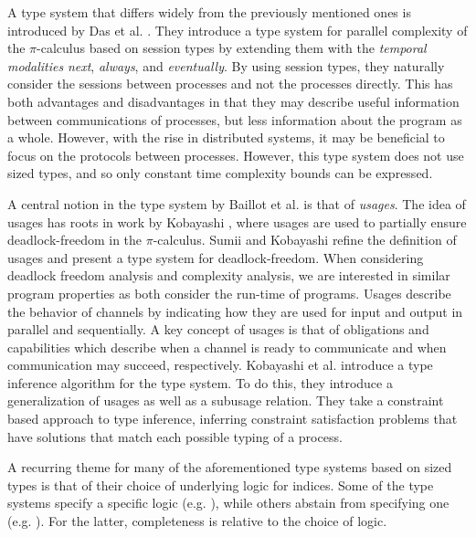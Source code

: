 A type system that differs widely from the previously mentioned ones is introduced by Das et al. \cite{DasEtAl2018}. They introduce a type system for parallel complexity of the $\pi$-calculus based on session types by extending them with the \textit{temporal modalities} \textit{next}, \textit{always}, and \textit{eventually}. By using session types, they naturally consider the sessions between processes and not the processes directly. This has both advantages and disadvantages in that they may describe useful information between communications of processes, but less information about the program as a whole. However, with the rise in distributed systems, it may be beneficial to focus on the protocols between processes. However, this type system does not use sized types, and so only constant time complexity bounds can be expressed.

A central notion in the type system by Baillot et al. is that of \textit{usages}. The idea of usages has roots in work by Kobayashi \cite{Kobayashi1998}, where usages are used to partially ensure deadlock-freedom in the $\pi$-calculus. Sumii and Kobayashi \cite{SumiiKobayashi1998} refine the definition of usages and present a type system for deadlock-freedom. When considering deadlock freedom analysis and complexity analysis, we are interested in similar program properties as both consider the run-time of programs. Usages describe the behavior of channels by indicating how they are used for input and output in parallel and sequentially. A key concept of usages is that of obligations and capabilities which describe when a channel is ready to communicate and when communication may succeed, respectively. Kobayashi et al. \cite{KobayashiEtAl2000} introduce a type inference algorithm for the type system. To do this, they introduce a generalization of usages as well as a subusage relation. They take a constraint based approach to type inference, inferring constraint satisfaction problems that have solutions that match each possible typing of a process.

A recurring theme for many of the aforementioned type systems based on sized types is that of their choice of underlying logic for indices. Some of the type systems specify a specific logic (e.g. \cite{HughesEtAl1996,HofmannAndJost2003,HofmannAndHoffmann2010,HoffmannEtAl2012}), while others abstain from specifying one (e.g. \cite{BaillotGhyselen2021,BaillotEtAl2021,DalLagoGaboardi2011}). For the latter, completeness is relative to the choice of logic. %

